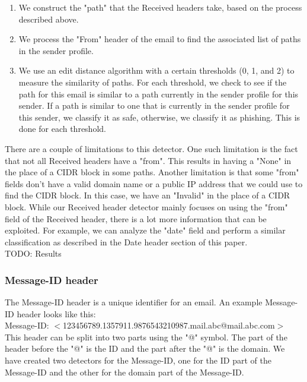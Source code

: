 \documentclass[letterpaper]{article}
\begin{document}
\begin{enumerate}
\item We construct the "path" that the Received headers take, based on the process described above.
\item We process the "From" header of the email to find the associated list of paths in the sender profile.
\item We use an edit distance algorithm with a certain thresholds (0, 1, and 2) to measure the similarity of paths. For each threshold, we check to see if the path for this email is similar to a path currently in the sender profile for this sender. If a path is similar to one that is currently in the sender profile for this sender, we classify it as safe, otherwise, we classify it as phishing. This is done for each threshold. 
\end{enumerate}

There are a couple of limitations to this detector. One such limitation is the fact that not all Received headers have a "from". This results in having a "None" in the place of a CIDR block in some paths. Another limitation is that some "from" fields don't have a valid domain name or a public IP address that we could use to find the CIDR block. In this case, we have an "Invalid" in the place of a CIDR block. While our Received header detector mainly focuses on using the "from" field of the Received header, there is a lot more information that can be exploited. For example, we can analyze the "date" field and perform a similar classification as described in the Date header section of this paper.\\

TODO: Results

\subsubsection{Message-ID header}

The Message-ID header is a unique identifier for an email. An example Message-ID header looks like this:\\

Message-ID: $<$123456789.1357911.9876543210987.mail.abc@mail.abc.com$>$\\

This header can be split into two parts using the "@" symbol. The part of the header before the "@" is the ID and the part after the "@" is the domain. We have created two detectors for the Message-ID, one for the ID part of the Message-ID and the other for the domain part of the Message-ID.\\
\end{document}
